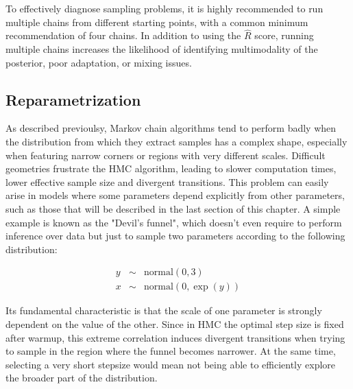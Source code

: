 To effectively diagnose sampling problems, it is highly recommended to run multiple chains from different starting
points, with a common minimum recommendation of four chains. In addition to using the $\hat{R}$ score, running multiple
chains increases the likelihood of identifying multimodality of the posterior, poor adaptation, or mixing issues.



\subsection{Reparametrization}\label{sec:repar}
As described previoulsy, Markov chain algorithms tend to perform badly when the distribution from which they extract samples has a complex shape, especially when featuring narrow corners or regions with very different scales.
Difficult geometries frustrate the HMC algorithm, leading to
slower computation times, lower effective sample size and divergent transitions. 
This problem can easily arise in models where some parameters depend explicitly from other parameters, such as those that will be described in the last section of this chapter.
A simple example is known as the
"Devil's funnel", which doesn't even require to perform inference over data but just to sample two parameters according to
the following distribution:

\begin{eqnarray}
  y&\sim&\mathrm{normal}(0,3)\\
  x &\sim&\mathrm{normal}(0,\exp(y))
\end{eqnarray}

Its fundamental characteristic is that the scale of one parameter is strongly dependent on the value of the other. Since
in HMC the optimal step size is fixed after warmup, this extreme correlation induces divergent transitions when trying to
sample in the region where the funnel becomes narrower. At the same time, selecting a very short stepsize would mean not being able to efficiently explore the broader part of the distribution.

